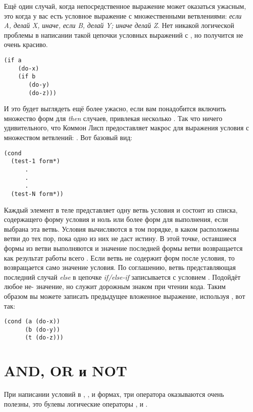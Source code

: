 Ещё один случай, когда непосредственное  выражение может оказаться ужасным, это
когда у вас есть условное выражение с множественными ветвлениями: \textit{если A, делай X,
  иначе, если B, делай Y; иначе делай Z}. Нет никакой логической проблемы в написании
такой цепочки условных выражений с , но получится не очень красиво.

\begin{lstlisting}
(if a
    (do-x)
    (if b
       (do-y)
       (do-z)))
\end{lstlisting}

И это будет выглядеть ещё более ужасно, если вам понадобится включить множество форм для
\textit{then} случаев, привлекая несколько . Так что ничего удивительного, что
Коммон Лисп предоставляет макрос для выражения условия с множеством ветвлений:
. Вот базовый вид:

\begin{lstlisting}
(cond
  (test-1 form*)
      .
      .
      .
  (test-N form*))
\end{lstlisting}

Каждый элемент в теле представляет одну ветвь условия и состоит из списка, содержащего
форму условия и ноль или более форм для выполнения, если выбрана эта ветвь. Условия
вычисляются в том порядке, в каком расположены ветви до тех пор, пока одно из них не даст
истину. В этой точке, оставшиеся формы из ветви выполняются и значение последней формы
ветви возвращается как результат работы всего . Если ветвь не содержит форм
после условия, то возвращается само значение условия. По соглашению, ветвь представляющая
последний случай \textit{else} в цепочке \textit{if/else-if} записывается с условием
. Подойдёт любое не- значение, но  служит дорожным знаком при
чтении кода. Таким образом вы можете записать предыдущее вложенное  выражение,
используя , вот так:

\begin{lstlisting}
(cond (a (do-x))
      (b (do-y))
      (t (do-z)))
\end{lstlisting}

\section{AND, OR и NOT}


При написании условий в , ,  и  формах, три
оператора оказываются очень полезны, это булевы логические операторы , 
и .

